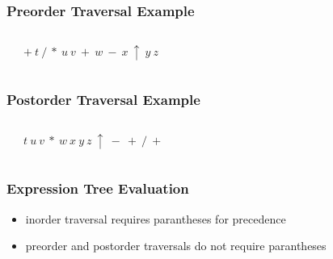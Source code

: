 \documentclass[dvipsnames]{beamer}
\begin{document}
\begin{frame}
  \frametitle{Preorder Traversal Example}

  \begin{example}
    \begin{columns}
      \begin{center}
      \end{center}

      $+ ~ t ~ / ~ * ~ u ~ v ~ + ~ w ~ - ~ x ~ \uparrow ~ y ~ z$
    \end{columns}
  \end{example}
\end{frame}

\begin{frame}
  \frametitle{Postorder Traversal Example}

  \begin{example}
    \begin{columns}
      \begin{center}
      \end{center}

      $t ~ u ~ v ~ * ~ w ~ x ~ y ~ z ~ \uparrow ~ - ~ + ~ / ~ +$
    \end{columns}
  \end{example}
\end{frame}

\begin{frame}
  \frametitle{Expression Tree Evaluation}

  \begin{itemize}
    \item inorder traversal requires parantheses for precedence
    \item preorder and postorder traversals do not require parantheses
  \end{itemize}
\end{frame}
\end{document}
